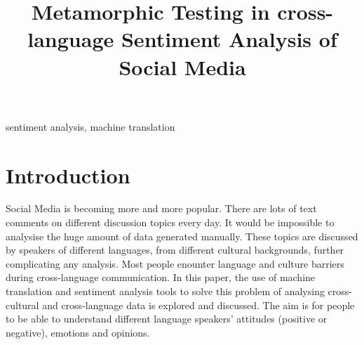 \documentclass[conference]{IEEEtran}
\begin{document}
\title{\huge Metamorphic Testing in cross-language Sentiment Analysis of Social Media}

\author{
\and
{}
\and
{}
\and
{}
}

\maketitle

\begin{abstract}
\end{abstract}

\begin{IEEEkeywords}
sentiment analysis, machine translation
\end{IEEEkeywords}

\section{Introduction}

\nocite{*}






Social Media is becoming more and more popular. There are lots of text comments
on different discussion topics every day.
It would be impossible to analysise the huge amount of data generated manually.
These topics are discussed by speakers of different languages, from different
cultural backgrounds, further complicating any analysis.
Most people enounter language and culture barriers during cross-language communication.
In this paper, the use of machine translation and sentiment analysis tools to
solve this problem of analysing cross-cultural and cross-language data is
explored and discussed.
The aim is for people to be able to understand different language speakers' attitudes (positive or negative), emotions and opinions.\\
\end{document}
